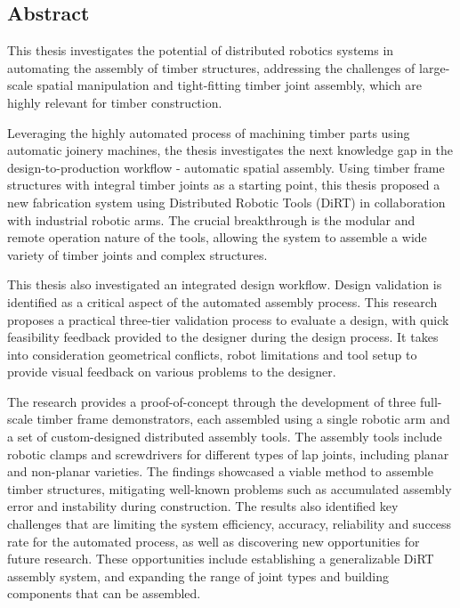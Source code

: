 \begin{adjustwidth}{20mm}{20mm}
\chapter*{Abstract}

This thesis investigates the potential of distributed robotics systems in automating the assembly of timber structures, addressing the challenges of large-scale spatial manipulation and tight-fitting timber joint assembly, which are highly relevant for timber construction.

Leveraging the highly automated process of machining timber parts using automatic joinery machines, the thesis investigates the next knowledge gap in the design-to-production workflow - automatic spatial assembly. Using timber frame structures with integral timber joints as a starting point, this thesis proposed a new fabrication system using Distributed Robotic Tools (DiRT) in collaboration with industrial robotic arms. The crucial breakthrough is the modular and remote operation nature of the tools, allowing the system to assemble a wide variety of timber joints and complex structures.

This thesis also investigated an integrated design workflow. Design validation is identified as a critical aspect of the automated assembly process. This research proposes a practical three-tier validation process to evaluate a design, with quick feasibility feedback provided to the designer during the design process. It takes into consideration geometrical conflicts, robot limitations and tool setup to provide visual feedback on various problems to the designer. 

The research provides a proof-of-concept through the development of three full-scale timber frame demonstrators, each assembled using a single robotic arm and a set of custom-designed distributed assembly tools. The assembly tools include robotic clamps and screwdrivers for different types of lap joints, including planar and non-planar varieties. The findings showcased a viable method to assemble timber structures, mitigating well-known problems such as accumulated assembly error and instability during construction. The results also identified key challenges that are limiting the system efficiency, accuracy, reliability and success rate for the automated process, as well as discovering new opportunities for future research. These opportunities include establishing a generalizable DiRT assembly system, and expanding the range of joint types and building components that can be assembled.


\end{adjustwidth}
